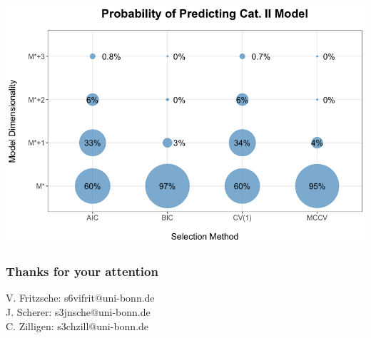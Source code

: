 \documentclass[20pt,mathserif,xcolor=dvipsnames]{beamer}
\begin{document}
\begin{frame}
\centering
\includegraphics[width=1.2\textheight]{Simulation2.png}
\end{frame}

\begin{frame}
\frametitle{Thanks for your attention }
V. Fritzsche: s6vifrit$@$uni-bonn.de\\
J. Scherer: s3jnsche$@$uni-bonn.de\\
C. Zilligen: s3chzill$@$uni-bonn.de

\end{frame}
\end{document}
